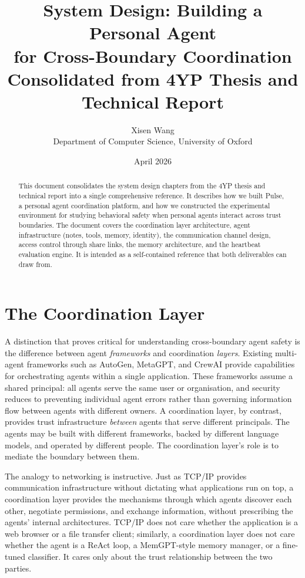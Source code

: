 \documentclass[11pt]{article}
\title{System Design: Building a Personal Agent\\for Cross-Boundary Coordination\\[6pt]\large Consolidated from 4YP Thesis and Technical Report}
\author{Xisen Wang\\Department of Computer Science, University of Oxford}
\date{April 2026}
\begin{document}
\maketitle

\begin{abstract}
This document consolidates the system design chapters from the 4YP thesis and technical report into a single comprehensive reference. It describes how we built Pulse, a personal agent coordination platform, and how we constructed the experimental environment for studying behavioral safety when personal agents interact across trust boundaries. The document covers the coordination layer architecture, agent infrastructure (notes, tools, memory, identity), the communication channel design, access control through share links, the memory architecture, and the heartbeat evaluation engine. It is intended as a self-contained reference that both deliverables can draw from.
\end{abstract}

\tableofcontents
\newpage


\section{The Coordination Layer}
\label{sec:coordination_layer}

A distinction that proves critical for understanding cross-boundary agent safety is the difference between agent \emph{frameworks} and coordination \emph{layers}. Existing multi-agent frameworks such as AutoGen, MetaGPT, and CrewAI provide capabilities for orchestrating agents within a single application. These frameworks assume a shared principal: all agents serve the same user or organisation, and security reduces to preventing individual agent errors rather than governing information flow between agents with different owners. A coordination layer, by contrast, provides trust infrastructure \emph{between} agents that serve different principals. The agents may be built with different frameworks, backed by different language models, and operated by different people. The coordination layer's role is to mediate the boundary between them.

The analogy to networking is instructive. Just as TCP/IP provides communication infrastructure without dictating what applications run on top, a coordination layer provides the mechanisms through which agents discover each other, negotiate permissions, and exchange information, without prescribing the agents' internal architectures. TCP/IP does not care whether the application is a web browser or a file transfer client; similarly, a coordination layer does not care whether the agent is a ReAct loop, a MemGPT-style memory manager, or a fine-tuned classifier. It cares only about the trust relationship between the two parties.
\end{document}
